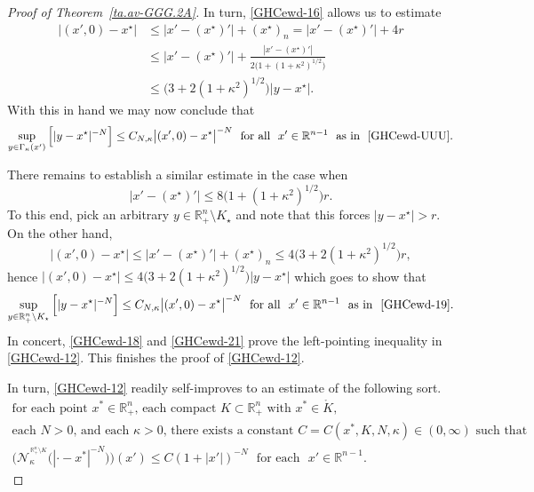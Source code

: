 \documentclass[11pt,reqno]{amsart}
\numberwithin{equation}{section}
\theoremstyle{remark}
\begin{document}
\begin{proof}[Proof of Theorem~\ref{ta.av-GGG.2A}]
%
In turn, \eqref{GHCewd-16} allows us to estimate 
%
\begin{align}\label{GHCewd-17}
\big|(x',0)-x^\star\big| &\leq\big|x'-(x^\star)'\big|+(x^\star)_n=\big|x'-(x^\star)'\big|+4r
\nonumber\\[4pt]
&\leq\big|x'-(x^\star)'\big|+\frac{|x'-(x^\star)'|}{2\big(1+(1+\kappa^2)^{1/2}\big)}
\nonumber\\[4pt]
&\leq\big(3+2(1+\kappa^2)^{1/2}\big)|y-x^\star|.
\end{align}
%
With this in hand we may now conclude that 
%
\begin{equation}\label{GHCewd-18}
\sup_{y\in\Gamma_\kappa(x')}\Big[|y-x^\star|^{-N}\Big]\leq C_{N,\kappa}
\big|(x',0)-x^\star\big|^{-N}\,\,\text{ for all }\,\,x'\in{\mathbb{R}}^{n-1}
\,\,\text{ as in }\,\,\eqref{GHCewd-UUU}.
\end{equation}

There remains to establish a similar estimate in the case when 
%
\begin{equation}\label{GHCewd-19}
\big|x'-(x^\star)'\big|\leq 8\big(1+(1+\kappa^2)^{1/2}\big)r.
\end{equation}
% 
To this end, pick an arbitrary $y\in{\mathbb{R}}^n_{+}\setminus K_\star$ and
note that this forces $|y-x^\star|>r$. On the other hand, 
%
\begin{equation}\label{GHCewd-20}
\big|(x',0)-x^\star\big|\leq\big|x'-(x^\star)'\big|+(x^\star)_n
\leq 4\big(3+2(1+\kappa^2)^{1/2}\big)r,
\end{equation}
% 
hence $\big|(x',0)-x^\star\big|\leq 4\big(3+2(1+\kappa^2)^{1/2}\big)|y-x^\star|$
which goes to show that
%
\begin{equation}\label{GHCewd-21}
\sup_{y\in{\mathbb{R}}^n_{+}\setminus K_\star}\Big[|y-x^\star|^{-N}\Big]\leq C_{N,\kappa}
\big|(x',0)-x^\star\big|^{-N}\,\,\text{ for all }\,\,x'\in{\mathbb{R}}^{n-1}
\,\,\text{ as in }\,\,\eqref{GHCewd-19}.
\end{equation}
%
In concert, \eqref{GHCewd-18} and \eqref{GHCewd-21} prove the left-pointing 
inequality in \eqref{GHCewd-12}. This finishes the proof of \eqref{GHCewd-12}.

In turn, \eqref{GHCewd-12} readily self-improves to an estimate of the following sort. 
%
\begin{equation}\label{GHCewd-12-best}
\begin{array}{c}
\text{for each point $x^\ast\in{\mathbb{R}}^n_{+}$, each compact $K\subset{\mathbb{R}}^n_{+}$ with $x^\ast\in\mathring{K}$}, 
\\[6pt]
\text{each $N>0$, and each $\kappa>0$, there exists a constant $C=C(x^\ast,K,N,\kappa)\in(0,\infty)$ such that}
\\[10pt]
\displaystyle
\big(\mathcal{N}^{^{\,{\mathbb{R}}^n_{+}\setminus K}}_\kappa\big(|\cdot-x^\ast|^{-N})\big)(x')\leq C(1+|x'|)^{-N}
\,\,\text{ for each }\,\,x'\in{\mathbb{R}}^{n-1}.
\end{array}
\end{equation}



\end{proof}
\end{document}
